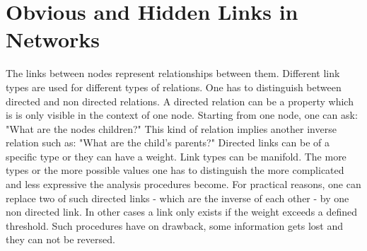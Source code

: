 \documentclass[a4paper,10pt]{scrbook}
\begin{document}
\section{Obvious and Hidden Links in Networks}
The links between nodes represent relationships between them. Different link types are used for different types of relations. One has to distinguish between directed and non directed relations. A directed relation can be a property which is is only visible in the context of one node. Starting from one node, one can ask: "What are the nodes children?" This kind of relation implies another inverse relation such as: "What are the child's parents?" Directed links can be of a specific type or they can have a weight. Link types can be manifold. The more types or the more possible values one has to distinguish the more complicated and less expressive the analysis procedures become. For practical reasons, one can replace two of such directed links - which are the inverse of each other - by one non directed link. In other cases a link only exists if the weight exceeds a defined threshold. Such procedures have on drawback, some information gets lost and they can not be reversed. 
\end{document}

